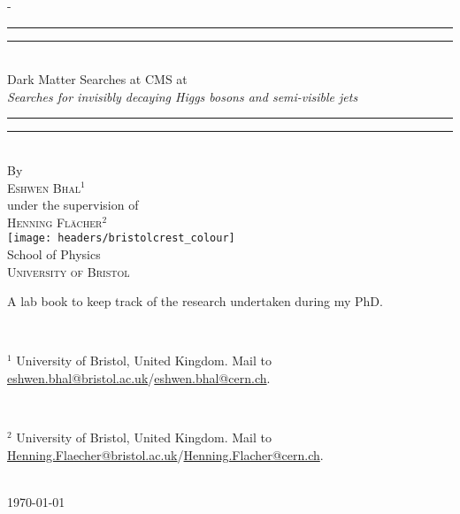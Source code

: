 \begin{titlingpage}
    \begin{SingleSpace}
    \calccentering{\unitlength} 
    \begin{adjustwidth*}{\unitlength}{-\unitlength}
    \vspace*{13mm}
    \begin{center}
    \rule[0.5ex]{\linewidth}{2pt}\vspace*{-\baselineskip}\vspace*{3.2pt}
    \rule[0.5ex]{\linewidth}{1pt}\\[\baselineskip]
    {\HUGE Dark Matter Searches at CMS at \comruntwo}\\[4mm] %
    {\Large \textit{Searches for invisibly decaying Higgs bosons and semi-visible jets}}\\ %
    \rule[0.5ex]{\linewidth}{1pt}\vspace*{-\baselineskip}\vspace{3.2pt}
    \rule[0.5ex]{\linewidth}{2pt}\\
    \vspace{6.5mm}
    {\large By}\\
    \vspace{6.5mm}
    {\large\textsc{Eshwen Bhal}$^{\text{1}}$}\\
    \vspace{6.5mm}
    {\large under the supervision of}\\
    \vspace{6.5mm}
    {\large\textsc{Henning Fl\"{a}cher}$^{\text{2}}$}\\  %
    \vspace{11mm}
    \texttt{[image: headers/bristolcrest\_colour]}\\  %
    \vspace{6mm}
    {\large School of Physics\\  %
    \textsc{University of Bristol}}\\  %
    \vspace{11mm}
    \begin{minipage}{10cm}
      \centering
      A lab book to keep track of the research undertaken during my PhD.
    
      \
  
      $^{\text{1}}$ University of Bristol, United Kingdom. Mail to \href{mailto:eshwen.bhal@bristol.ac.uk}{eshwen.bhal@bristol.ac.uk}/\href{mailto:eshwen.bhal@cern.ch}{eshwen.bhal@cern.ch}.
  
      \
  
      $^{\text{2}}$ University of Bristol, United Kingdom. Mail to \href{mailto:Henning.Flaecher@bristol.ac.uk}{Henning.Flaecher@bristol.ac.uk}/\href{mailto:Henning.Flacher@cern.ch}{Henning.Flacher@cern.ch}.
    \end{minipage}\\
    \vspace{9mm}
    {\large\textsc{\today}}  %
    \vspace{12mm}
    \end{center}
    \end{adjustwidth*}
    \end{SingleSpace}
  \end{titlingpage}
